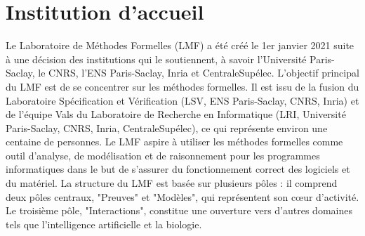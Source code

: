 \documentclass[french,titlepage]{article}
\begin{document}





\appendix
\section{Institution d'accueil}
Le Laboratoire de Méthodes Formelles (LMF) a été créé le 1er janvier
2021 suite à une décision des institutions qui le soutiennent, à savoir l'Université Paris-Saclay, le CNRS, l'ENS Paris-Saclay, Inria et CentraleSupélec. L'objectif principal du LMF est de se concentrer sur les méthodes formelles. Il est issu de la fusion du Laboratoire Spécification et Vérification (LSV, ENS Paris-Saclay, CNRS, Inria) et de l'équipe Vals du Laboratoire de Recherche en Informatique (LRI, Université Paris-Saclay, CNRS, Inria, CentraleSupélec), ce qui représente environ une centaine de personnes. Le LMF aspire à utiliser les méthodes formelles comme outil d'analyse, de modélisation et de raisonnement pour les programmes informatiques dans le but de s'assurer du fonctionnement correct des logiciels et du matériel. La structure du LMF est basée sur plusieurs pôles : il comprend deux pôles centraux, "Preuves" et "Modèles", qui représentent son cœur d'activité. Le troisième pôle, "Interactions", constitue une ouverture vers d'autres domaines tels que l'intelligence artificielle et la biologie.
\end{document}

